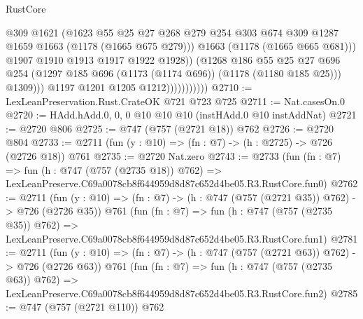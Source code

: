 \begin{lexlean}{RustCore}
\begin{coremodule}
                                    @309
                                    @1621
                                    (@1623
                                      @55
                                      @25
                                      @27
                                      @268
                                      @279
                                      @254
                                      @303
                                      @674
                                      @309
                                      @1287
                                      @1659
                                      @1663
                                      (@1178 (@1665 @675 @279)))
                                    @1663
                                    (@1178 (@1665 @665 @681)))
                                  @1907
                                  @1910
                                  @1913
                                  @1917
                                  @1922
                                  @1928))
                              (@1268
                                @186
                                @55
                                @25
                                @27
                                @696
                                @254
                                (@1297 @185 @696 (@1173 (@1174 @696)) (@1178 (@1180 @185 @25)))
                                @1309)))
                          @1197
                          @1201
                          @1205
                          @1212)))))))))))
@2710 := LexLeanPreservation.Rust.CrateOK @721 @723 @725
@2711 := Nat.casesOn.{0}
@2720 := HAdd.hAdd.{0, 0, 0} @10 @10 @10 (instHAdd.{0} @10 instAddNat)
@2721 := @2720 @806
@2725 := @747 (@757 (@2721 @18)) @762
@2726 := @2720 @804
@2733 := @2711 (fun (y : @10) => (fn : @7) -> (h : @2725) -> @726 (@2726 @18)) @761
@2735 := @2720 Nat.zero
@2743 := @2733
    (fun (fn : @7) =>
    fun (h : @747 (@757 (@2735 @18)) @762) =>
    LexLeanPreserve.C69a0078cb8f644959d8d87c652d4be05.R3.RustCore.fun0)
@2762 := @2711
    (fun (y : @10) => (fn : @7) -> (h : @747 (@757 (@2721 @35)) @762) -> @726 (@2726 @35))
    @761
    (fun (fn : @7) =>
    fun (h : @747 (@757 (@2735 @35)) @762) =>
    LexLeanPreserve.C69a0078cb8f644959d8d87c652d4be05.R3.RustCore.fun1)
@2781 := @2711
    (fun (y : @10) => (fn : @7) -> (h : @747 (@757 (@2721 @63)) @762) -> @726 (@2726 @63))
    @761
    (fun (fn : @7) =>
    fun (h : @747 (@757 (@2735 @63)) @762) =>
    LexLeanPreserve.C69a0078cb8f644959d8d87c652d4be05.R3.RustCore.fun2)
@2785 := @747 (@757 (@2721 @110)) @762

\end{coremodule}
\end{lexlean}
